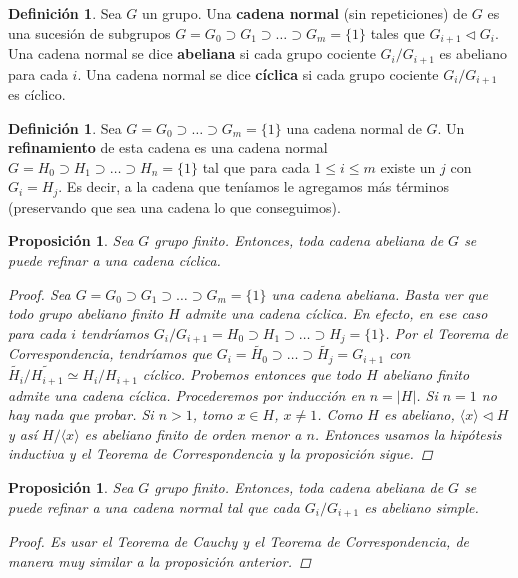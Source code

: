 \documentclass[12pt]{book}
\newtheorem{prop}[teo]{Proposición}
\theoremstyle{definition}
\newtheorem{defn}[teo]{Definición}
\begin{document}
\begin{defn}
Sea $G$ un grupo. Una \textbf{cadena normal} (sin repeticiones) de $G$ es una sucesión de subgrupos $G=G_0\supset G_1\supset\ldots\supset G_m=\{1\}$ tales que $G_{i+1}\triangleleft G_i$. Una cadena normal se dice \textbf{abeliana} si cada grupo cociente $G_i/G_{i+1}$  es abeliano para cada $i$. Una cadena normal se dice \textbf{cíclica} si cada grupo cociente $G_i/G_{i+1}$ es cíclico.
\end{defn}

\begin{defn}
Sea $G=G_0\supset\ldots\supset G_m=\{1\}$ una cadena normal de $G$. Un \textbf{refinamiento} de esta cadena es una cadena normal $G=H_0\supset H_1\supset\ldots \supset H_n = \{1\}$ tal que para cada $1\leq i\leq m$ existe un $j$ con $G_i=H_j$. Es decir, a la cadena que teníamos le agregamos más términos (preservando que sea una cadena lo que conseguimos).
\end{defn}

\begin{prop}
Sea $G$ grupo finito. Entonces, toda cadena abeliana de $G$ se puede refinar a una cadena cíclica.
\begin{proof}
Sea $G=G_0\supset G_1\supset\ldots\supset G_m=\{1\}$ una cadena abeliana. Basta ver que todo grupo abeliano finito $H$ admite una cadena cíclica. En efecto, en ese caso para cada $i$ tendríamos $G_i/G_{i+1}=H_0\supset H_1\supset\ldots\supset H_j=\{1\}$. Por el Teorema de Correspondencia, tendríamos que $G_i = \widetilde{H_0}\supset\ldots \supset\widetilde{H_j}=G_{i+1}$ con $\widetilde{H_i}/\widetilde{H_{i+1}} \simeq H_i/H_{i+1}$ cíclico. Probemos entonces que todo $H$ abeliano finito admite una cadena cíclica. Procederemos por inducción en $n=|H|$. Si $n=1$ no hay nada que probar. Si $n>1$, tomo $x\in H$, $x\neq 1$. Como $H$ es abeliano, $\langle x\rangle\triangleleft H$ y así $H/\langle x\rangle$ es abeliano finito de orden menor a $n$. Entonces usamos la hipótesis inductiva y el Teorema de Correspondencia y la proposición sigue.
\end{proof}
\end{prop}

\begin{prop}
Sea $G$ grupo finito. Entonces, toda cadena abeliana de $G$ se puede refinar a una cadena normal tal que cada $G_i/G_{i+1}$ es abeliano simple.
\begin{proof}
Es usar el Teorema de Cauchy y el Teorema de Correspondencia, de manera muy similar a la proposición anterior.
\end{proof}
\end{prop}
\end{document}
